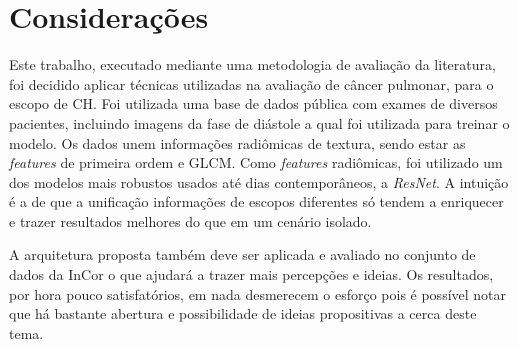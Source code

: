 \chapter{Considerações}
\label{chap:conclusao}

Este trabalho, executado mediante uma metodologia de avaliação da literatura, foi decidido aplicar técnicas utilizadas na avaliação de câncer pulmonar, para o escopo de CH. Foi utilizada uma base de dados pública com exames de diversos pacientes, incluindo imagens da fase de diástole a qual foi utilizada para treinar o modelo. Os dados unem informações radiômicas de textura, sendo estar as \textit{features} de primeira ordem e \gls{GLCM}. Como \textit{features} radiômicas, foi utilizado um dos modelos mais robustos usados até dias contemporâneos, a \textit{ResNet}. A intuição é a de que a unificação informações de escopos diferentes só tendem a enriquecer e trazer resultados melhores do que em um cenário isolado.

A arquitetura proposta também deve ser aplicada e avaliado no conjunto de dados da \gls{InCor} o que ajudará a trazer mais percepções e ideias. Os resultados, por hora pouco satisfatórios, em nada desmerecem o esforço pois é possível notar que há bastante abertura e possibilidade de ideias propositivas a cerca deste tema. 